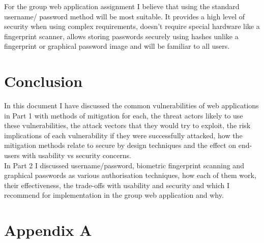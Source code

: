 \documentclass{ueacmpstyle}
\begin{document}
    For the group web application assignment I believe that using the standard username/
    password method will be most suitable. It provides a high level of security when using 
    complex requirements, doesn't require special hardware like a fingerprint scanner, allows 
    storing passwords securely using hashes unlike a fingerprint or graphical password image 
    and will be familiar to all users. 

    \section{Conclusion}\label{sec:Con}
    In this document I have discussed the common vulnerabilities of web applications in Part 1 
    with methods of mitigation for each, the threat actors likely to use these vulnerabilities, the attack 
    vectors that they would try to exploit, the risk implications of each vulnerability if 
    they were successfully attacked, how the mitigation methods relate to secure by design 
    techniques and the effect on end-users with usability vs security concerns.
    \\
    In Part 2 I discussed username/password, biometric fingerprint scanning and graphical 
    passwords as various authorisation techniques, how each of them work, their effectiveness, 
    the trade-offs with usability and security and which I recommend for implementation in 
    the group web application and why.
    
    

  \newpage

	
	
	\newpage
	
	\appendix
        \section{Appendix A}\label{app:A}   %
\end{document}
